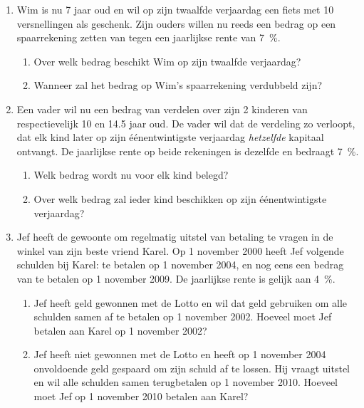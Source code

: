 \begin{enumerate}
    \item  Wim is nu 7 jaar oud en wil op zijn twaalfde
    verjaardag een
    fiets met 10 versnellingen als geschenk. Zijn ouders willen nu
    reeds een bedrag op een spaarrekening zetten van  tegen een
    jaarlijkse rente van \SI{7}{\percent}.
    \begin{enumerate}
        \item   Over welk bedrag beschikt Wim op zijn
    twaalfde verjaardag?

        \item  Wanneer zal het bedrag op Wim's spaarrekening verdubbeld
        zijn?

    \end{enumerate}
  

    \item  Een vader wil nu een bedrag van  verdelen over zijn
    2 kinderen van respectievelijk 10 en \num{14,5} jaar oud. De vader wil
    dat de verdeling zo verloopt, dat elk kind later op zijn
    \'{e}\'{e}nentwintigste verjaardag \emph{hetzelfde} kapitaal ontvangt.
    De jaarlijkse rente op beide rekeningen is dezelfde en bedraagt \SI{7}{\percent}.
    \begin{enumerate}
        \item   Welk bedrag wordt nu voor elk kind belegd?
        \item  Over welk bedrag zal ieder kind beschikken op zijn
        \'{e}\'{e}nentwintigste verjaardag?
    \end{enumerate}


    \item  Jef heeft de gewoonte om regelmatig uitstel van betaling te
    vragen in de winkel van zijn beste vriend Karel. Op 1 november
    2000 heeft Jef volgende schulden bij Karel:
     te betalen op 1 november 2004, en nog eens een bedrag
    van  te betalen op 1 november 2009. 
    De jaarlijkse rente is gelijk aan  \SI{4}{\percent}.
    \begin{enumerate}
        \item  Jef heeft geld gewonnen met de Lotto en wil dat geld
        gebruiken om alle schulden samen af te betalen op 1 november
        2002. Hoeveel moet Jef betalen aan Karel op 1
        november 2002?

        \item  Jef heeft niet gewonnen met de Lotto en heeft op 1 november 2004  onvoldoende geld
       gespaard om zijn schuld af te lossen. Hij vraagt uitstel
        en wil alle schulden samen terugbetalen op 1 november 2010.
        Hoeveel moet Jef op 1 november 2010 betalen aan Karel?


\end{enumerate}
\end{enumerate}
